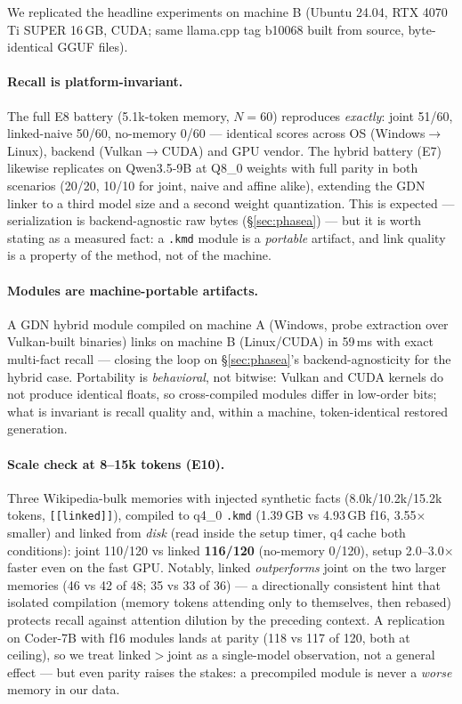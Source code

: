 \documentclass[11pt]{article}
\newcommand{\kmd}{\texttt{.kmd}}
\newcommand{\code}[1]{\texttt{#1}}
\begin{document}
We replicated the headline experiments on machine B (Ubuntu 24.04, RTX 4070 Ti SUPER 16\,GB, CUDA; same llama.cpp tag b10068 built from source, byte-identical GGUF files).

\paragraph{Recall is platform-invariant.}
The full E8 battery (5.1k-token memory, $N{=}60$) reproduces \emph{exactly}: joint 51/60, linked-naive 50/60, no-memory 0/60 --- identical scores across OS (Windows$\to$Linux), backend (Vulkan$\to$CUDA) and GPU vendor. The hybrid battery (E7) likewise replicates on Qwen3.5-9B at Q8\_0 weights with full parity in both scenarios (20/20, 10/10 for joint, naive and affine alike), extending the GDN linker to a third model size and a second weight quantization. This is expected --- serialization is backend-agnostic raw bytes (\S\ref{sec:phasea}) --- but it is worth stating as a measured fact: a \kmd{} module is a \emph{portable} artifact, and link quality is a property of the method, not of the machine.

\paragraph{Modules are machine-portable artifacts.}
A GDN hybrid module compiled on machine A (Windows, probe extraction over Vulkan-built binaries) links on machine B (Linux/CUDA) in 59\,ms with exact multi-fact recall --- closing the loop on \S\ref{sec:phasea}'s backend-agnosticity for the hybrid case. Portability is \emph{behavioral}, not bitwise: Vulkan and CUDA kernels do not produce identical floats, so cross-compiled modules differ in low-order bits; what is invariant is recall quality and, within a machine, token-identical restored generation.

\paragraph{Scale check at 8--15k tokens (E10).}
Three Wikipedia-bulk memories with injected synthetic facts (8.0k/10.2k/15.2k tokens, \code{[[linked]]}), compiled to q4\_0 \kmd{} (1.39\,GB vs 4.93\,GB f16, 3.55$\times$ smaller) and linked from \emph{disk} (read inside the setup timer, q4 cache both conditions): joint 110/120 vs linked \textbf{116/120} (no-memory 0/120), setup 2.0--3.0$\times$ faster even on the fast GPU. Notably, linked \emph{outperforms} joint on the two larger memories (46 vs 42 of 48; 35 vs 33 of 36) --- a directionally consistent hint that isolated compilation (memory tokens attending only to themselves, then rebased) protects recall against attention dilution by the preceding context. A replication on Coder-7B with f16 modules lands at parity (118 vs 117 of 120, both at ceiling), so we treat linked${>}$joint as a single-model observation, not a general effect --- but even parity raises the stakes: a precompiled module is never a \emph{worse} memory in our data.
\end{document}
